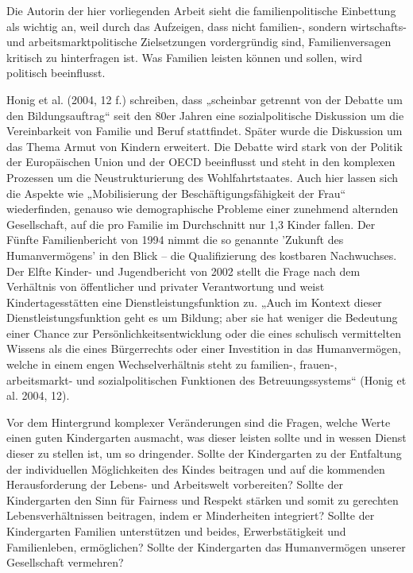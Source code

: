 Die Autorin der hier vorliegenden Arbeit sieht die familienpolitische Einbettung als wichtig an, weil durch das Aufzeigen, dass nicht familien-, sondern wirtschafts- und arbeitsmarktpolitische Zielsetzungen vordergründig sind, Familienversagen kritisch zu hinterfragen ist. Was Familien leisten können und sollen, wird politisch beeinflusst.
 
Honig et al. (2004, 12 f.) schreiben, dass „scheinbar getrennt von der Debatte um den Bildungsauftrag“ seit den 80er Jahren eine sozialpolitische Diskussion um die Vereinbarkeit von Familie und Beruf stattfindet. Später wurde die Diskussion um das Thema Armut von Kindern erweitert. Die Debatte wird stark von der Politik der Europäischen Union und der OECD beeinflusst und steht in den komplexen Prozessen um die Neustrukturierung des Wohlfahrtstaates. Auch hier lassen sich die Aspekte wie „Mobilisierung der Beschäftigungsfähigkeit der Frau“ wiederfinden, genauso wie demographische Probleme einer zunehmend alternden Gesellschaft, auf die pro Familie im Durchschnitt nur 1,3 Kinder fallen. Der Fünfte Familienbericht von 1994 nimmt die so genannte 'Zukunft des Humanvermögens' in den Blick -- die Qualifizierung des kostbaren Nachwuchses. Der Elfte Kinder- und Jugendbericht von 2002 stellt die Frage nach dem Verhältnis von öffentlicher und privater Verantwortung und weist Kindertagesstätten eine Dienstleistungsfunktion zu. „Auch im Kontext dieser Dienstleistungsfunktion geht es um Bildung; aber sie hat weniger die Bedeutung einer Chance zur Persönlichkeitsentwicklung oder die eines schulisch vermittelten Wissens als die eines Bürgerrechts oder einer Investition in das Humanvermögen, welche in einem engen Wechselverhältnis steht zu familien-, frauen-, arbeitsmarkt- und sozialpolitischen Funktionen des Betreuungssystems“ (Honig et al. 2004, 12).  
 
Vor dem Hintergrund komplexer Veränderungen sind die Fragen, welche Werte einen guten Kindergarten ausmacht, was dieser leisten sollte und in wessen Dienst dieser zu stellen ist, um so dringender. Sollte der Kindergarten zu der Entfaltung der individuellen Möglichkeiten des Kindes beitragen und auf die kommenden Herausforderung der Lebens- und Arbeitswelt vorbereiten? Sollte der Kindergarten den Sinn für Fairness und Respekt stärken und somit zu gerechten Lebensverhältnissen beitragen, indem er Minderheiten integriert? Sollte der Kindergarten Familien unterstützen und beides, Erwerbstätigkeit und Familienleben, ermöglichen? Sollte der Kindergarten das Humanvermögen unserer Gesellschaft vermehren? 

